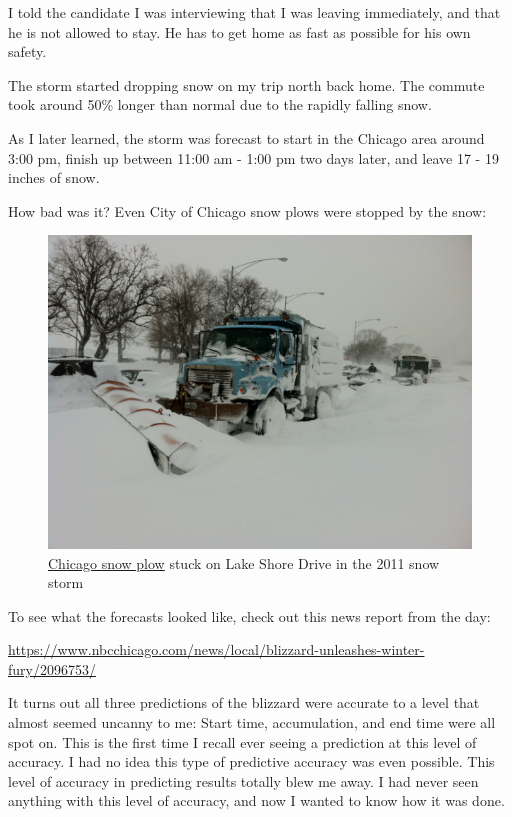 \documentclass[
]{book}
\begin{document}
I told the candidate I was interviewing that I was leaving immediately,
and that he is not allowed to stay. He has to get home as fast as
possible for his own safety.

The storm started dropping snow on my trip north back home. The commute
took around 50\% longer than normal due to the rapidly falling snow.

As I later learned, the storm was forecast to start in the Chicago area
around 3:00 pm, finish up between 11:00 am - 1:00 pm two days later, and
leave 17 - 19 inches of snow.

How bad was it? Even City of Chicago snow plows were stopped by the
snow:

\begin{figure}
\centering
\includegraphics{_book/images/Chicago_Snow_Plow_stuck_on_Lake_Shore_drive_Chicago_Feb_2_2011_storm.jpg}
\caption{\href{https://en.wikipedia.org/wiki/2011_Groundhog_Day_blizzard\#/media/File:Stuck_Salt_Truck_on_Lake_Shore_drive_Chicago_Feb_2_2011_storm.JPG}{Chicago snow
plow}
stuck on Lake Shore Drive in the 2011 snow
storm}
\end{figure}

To see what the forecasts looked like, check out this news report from
the day:

\url{https://www.nbcchicago.com/news/local/blizzard-unleashes-winter-fury/2096753/}

It turns out all three predictions of the blizzard were accurate to a
level that almost seemed uncanny to me: Start time, accumulation, and
end time were all spot on. This is the first time I recall ever seeing a
prediction at this level of accuracy. I had no idea this type of
predictive accuracy was even possible. This level of accuracy in
predicting results totally blew me away. I had never seen anything with
this level of accuracy, and now I wanted to know how it was done.
\end{document}
